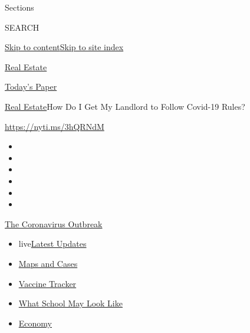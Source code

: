 Sections

SEARCH

\protect\hyperlink{site-content}{Skip to
content}\protect\hyperlink{site-index}{Skip to site index}

\href{https://www.nytimes3xbfgragh.onion/section/realestate}{Real
Estate}

\href{https://myaccount.nytimes3xbfgragh.onion/auth/login?response_type=cookie\&client_id=vi}{}

\href{https://www.nytimes3xbfgragh.onion/section/todayspaper}{Today's
Paper}

\href{/section/realestate}{Real Estate}\textbar{}How Do I Get My
Landlord to Follow Covid-19 Rules?

\url{https://nyti.ms/3hQRNdM}

\begin{itemize}
\item
\item
\item
\item
\item
\item
\end{itemize}

\href{https://www.nytimes3xbfgragh.onion/news-event/coronavirus?action=click\&pgtype=Article\&state=default\&region=TOP_BANNER\&context=storylines_menu}{The
Coronavirus Outbreak}

\begin{itemize}
\tightlist
\item
  live\href{https://www.nytimes3xbfgragh.onion/2020/08/01/world/coronavirus-covid-19.html?action=click\&pgtype=Article\&state=default\&region=TOP_BANNER\&context=storylines_menu}{Latest
  Updates}
\item
  \href{https://www.nytimes3xbfgragh.onion/interactive/2020/us/coronavirus-us-cases.html?action=click\&pgtype=Article\&state=default\&region=TOP_BANNER\&context=storylines_menu}{Maps
  and Cases}
\item
  \href{https://www.nytimes3xbfgragh.onion/interactive/2020/science/coronavirus-vaccine-tracker.html?action=click\&pgtype=Article\&state=default\&region=TOP_BANNER\&context=storylines_menu}{Vaccine
  Tracker}
\item
  \href{https://www.nytimes3xbfgragh.onion/interactive/2020/07/29/us/schools-reopening-coronavirus.html?action=click\&pgtype=Article\&state=default\&region=TOP_BANNER\&context=storylines_menu}{What
  School May Look Like}
\item
  \href{https://www.nytimes3xbfgragh.onion/live/2020/07/31/business/stock-market-today-coronavirus?action=click\&pgtype=Article\&state=default\&region=TOP_BANNER\&context=storylines_menu}{Economy}
\end{itemize}

